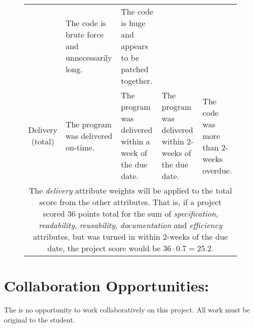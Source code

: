 \documentclass[10pt]{article}
\begin{document}
\begin{figure}
\begin{center}
\begin{tabular}{c p{1.2in} p{1.2in} p{1.2in} p{1.2in}}
                     & The code is brute force and unnecessarily long.
                     & The code is huge and appears to be patched together. \\
      Delivery (total) & The program was delivered on-time.
                       & The program was delivered within a week of the due date. 
                       & The program was delivered within 2-weeks of the due date. 
                       & The code was more than 2-weeks overdue. \\ \hline
      \multicolumn{5}{p{\textwidth}}{The \emph{delivery} attribute weights will be applied to the total score from the other attributes. That is, if a project scored 36 points total for the sum of \emph{specification}, \emph{readability}, \emph{reusability}, \emph{documentation} and \emph{efficiency} attributes, but was turned in within 2-weeks of the due date, the project score would be $36 \cdot 0.7 = 25.2$.}
   \end{tabular}
 \end{center}
\end{figure}

\section*{Collaboration Opportunities:}

The is no opportunity to work collaboratively on this project. All work must be original to the student. 
\end{document}
